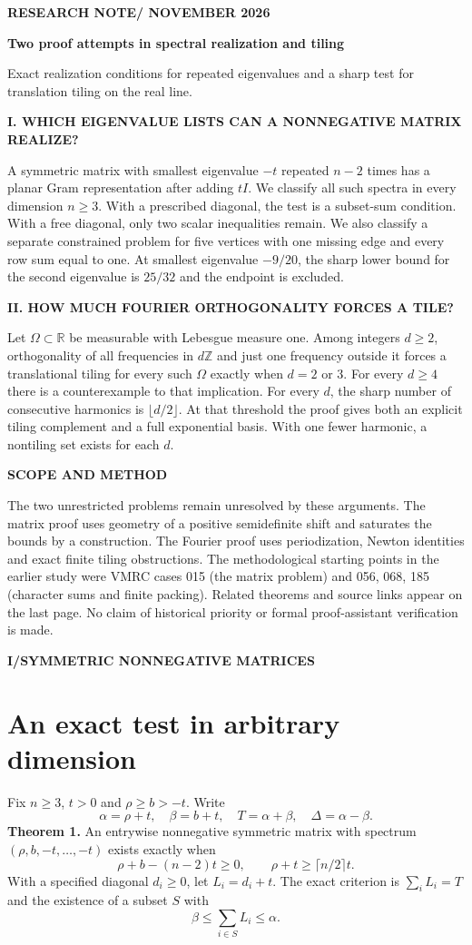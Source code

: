 \documentclass[11pt,a4paper]{article}
\newcommand{\kicker}[1]{\par{\sffamily\bfseries\color{teal}\small #1}\par}
\newcommand{\sect}[1]{\section*{#1}}
\newcommand{\R}{\mathbb R}\newcommand{\Z}{\mathbb Z}\newcommand{\C}{\mathbb C}
\begin{document}
\kicker{RESEARCH NOTE\quad / NOVEMBER 2026}
\vspace{3mm}
{\sffamily\bfseries\color{ink}\fontsize{29}{35}\selectfont Two proof attempts in spectral realization and tiling\par}
\vspace{2mm}
{\large Exact realization conditions for repeated eigenvalues and a sharp test for translation tiling on the real line.\par}
\vspace{4mm}
\kicker{I. WHICH EIGENVALUE LISTS CAN A NONNEGATIVE MATRIX REALIZE?}
A symmetric matrix with smallest eigenvalue $-t$ repeated $n-2$ times has a planar Gram representation after adding $tI$. We classify all such spectra in every dimension $n\ge3$. With a prescribed diagonal, the test is a subset-sum condition. With a free diagonal, only two scalar inequalities remain. We also classify a separate constrained problem for five vertices with one missing edge and every row sum equal to one. At smallest eigenvalue $-9/20$, the sharp lower bound for the second eigenvalue is $25/32$ and the endpoint is excluded.
\vspace{3mm}
\kicker{II. HOW MUCH FOURIER ORTHOGONALITY FORCES A TILE?}
Let $\Omega\subset\R$ be measurable with Lebesgue measure one. Among integers $d\ge2$, orthogonality of all frequencies in $d\Z$ and just one frequency outside it forces a translational tiling for every such $\Omega$ exactly when $d=2$ or $3$. For every $d\ge4$ there is a counterexample to that implication. For every $d$, the sharp number of consecutive harmonics is $\lfloor d/2\rfloor$. At that threshold the proof gives both an explicit tiling complement and a full exponential basis. With one fewer harmonic, a nontiling set exists for each $d$.
\vspace{3mm}
\kicker{SCOPE AND METHOD}
The two unrestricted problems remain unresolved by these arguments. The matrix proof uses geometry of a positive semidefinite shift and saturates the bounds by a construction. The Fourier proof uses periodization, Newton identities and exact finite tiling obstructions. The methodological starting points in the earlier study were VMRC cases 015 (the matrix problem) and 056, 068, 185 (character sums and finite packing). Related theorems and source links appear on the last page. No claim of historical priority or formal proof-assistant verification is made.
\clearpage
{}
\kicker{I\quad /\quad SYMMETRIC NONNEGATIVE MATRICES}
\sect{An exact test in arbitrary dimension}
Fix $n\ge3$, $t>0$ and $\rho\ge b>-t$. Write
\[
 \alpha=\rho+t,\quad \beta=b+t,\quad T=\alpha+\beta,\quad \Delta=\alpha-\beta .
\]
\textbf{Theorem 1.} An entrywise nonnegative symmetric matrix with spectrum $(\rho,b,-t,\ldots,-t)$ exists exactly when
\[
             \boxed{\rho+b-(n-2)t\ge0,\qquad \rho+t\ge\lceil n/2\rceil t.}
\]
With a specified diagonal $d_i\ge0$, let $L_i=d_i+t$. The exact criterion is $\sum_i L_i=T$ and the existence of a subset $S$ with
\[
                     \beta\le\sum_{i\in S}L_i\le\alpha.
\]
\end{document}
